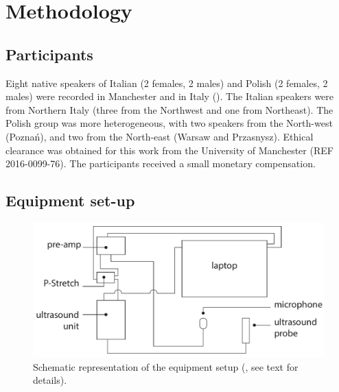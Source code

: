 \documentclass[authoryear, twocolumn]{elsarticle}
\begin{document}
\section{Methodology}\label{methodology}

\subsection{Participants}\label{participants}


Eight native speakers of Italian (2 females, 2 males) and Polish (2
females, 2 males) were recorded in Manchester and in Italy
(). The Italian speakers were from Northern Italy
(three from the Northwest and one from Northeast). The Polish group was
more heterogeneous, with two speakers from the North-west (Poznań), and
two from the North-east (Warsaw and Przasnysz). Ethical clearance was
obtained for this work from the University of Manchester (REF
2016-0099-76). The participants received a small monetary compensation.

\subsection{Equipment set-up}\label{equipment-set-up}

\begin{figure}
    \centering
    \includegraphics[width=.7\textwidth]{../../graphics/uti-setup.pdf}
    \caption{Schematic representation of the equipment setup (\citealt{articulate2011}, see text for details).}
    \label{f:uti-setup}
\end{figure}
\end{document}

